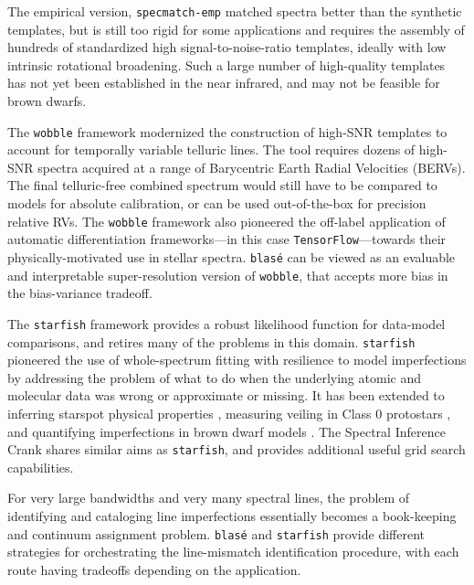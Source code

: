 \documentclass[modern]{aastex631}
\begin{document}
The empirical version, \texttt{specmatch-emp} \citep{2017ApJ...836...77Y} matched spectra better than the synthetic templates, but is still too rigid for some applications and requires the assembly of hundreds of standardized high signal-to-noise-ratio templates, ideally with low intrinsic rotational broadening.  Such a large number of high-quality templates has not yet been established in the near infrared, and may not be feasible for brown dwarfs.

The \texttt{wobble} framework \citep{2019AJ....158..164B} modernized the construction of high-SNR templates to account for temporally variable telluric lines. The tool requires dozens of high-SNR spectra acquired at a range of Barycentric Earth Radial Velocities (BERVs).  The final telluric-free combined spectrum would still have to be compared to models for absolute calibration, or can be used out-of-the-box for precision relative RVs.  The \texttt{wobble} framework also pioneered the off-label application of automatic differentiation frameworks---in this case \texttt{TensorFlow}---towards their physically-motivated use in stellar spectra.  \texttt{blas\'e} can be viewed as an evaluable and interpretable super-resolution version of \texttt{wobble}, that accepts more bias in the bias-variance tradeoff.

The \texttt{starfish} framework \citep{czekala15} provides a robust likelihood function for data-model comparisons, and retires many of the problems in this domain.  \texttt{starfish} pioneered the use of whole-spectrum fitting with resilience to model imperfections by addressing the problem of what to do when the underlying atomic and molecular data was wrong or approximate or missing.  It has been extended to inferring starspot physical properties \citep{2017ApJ...836..200G}, measuring veiling in Class 0 protostars \citep{2018ApJ...862...85G}, and quantifying imperfections in brown dwarf models \citep{2021ApJ...921...95Z}.  The Spectral Inference Crank \citep[\texttt{sick},][]{2016ApJS..223....8C} shares similar aims as \texttt{starfish}, and provides additional useful grid search capabilities.

For very large bandwidths and very many spectral lines, the problem of identifying and cataloging line imperfections essentially becomes a book-keeping and continuum assignment problem.  \texttt{blas\'e} and \texttt{starfish} provide different strategies for orchestrating the line-mismatch identification procedure, with each route having tradeoffs depending on the application.
\end{document}
